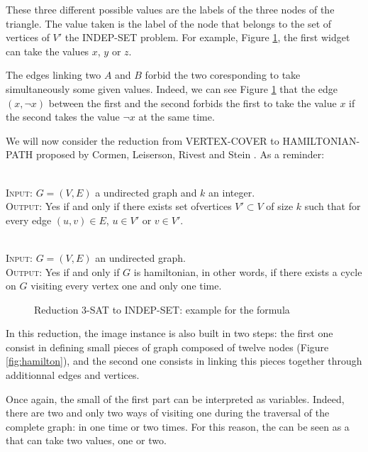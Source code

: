 These three different possible values are the labels of the three
nodes of the triangle. The value taken is the label of the node that
belongs to the set of vertices of $V'$ the INDEP-SET problem. For
example, Figure \ref{fig:3sat}, the first widget can take the
values $x$, $y$ or $z$.

The edges linking two \widgets $A$ and $B$ forbid the two coresponding
\variables to take simultaneously some given values. Indeed, we can
see Figure \ref{fig:3sat} that the edge $(x, \neg x)$ between the
first and the second \widgets forbids the first \widget to take the
value $x$ if the second takes the value $\neg x$ at the same time.

We will now consider the reduction from VERTEX-COVER to
HAMILTONIAN-PATH proposed by Cormen, Leiserson, Rivest and Stein
\cite{cormen}. As a reminder:

\begin{definition}
\ \\
  \textsc{Input:} $G=(V,E)$ a undirected graph and $k$ an integer. \\
  \textsc{Output:} Yes if and only if there exists set ofvertices $V'
  \subset V$ of size $k$ such that for every edge $(u,v) \in E$, $u
  \in V'$ or $v \in V'$.\\
\end{definition}

\begin{definition} 
\ \\
  \textsc{Input:} $G=(V,E)$ an undirected graph.\\
  \textsc{Output:} Yes if and only if $G$ is hamiltonian, in other
  words, if there exists a cycle on $G$ visiting every vertex one and
  only one time.\\
\end{definition}

\begin{figure}
  \centering
  
  \caption{Reduction 3-SAT to INDEP-SET: example for the formula %
}
  \label{fig:3sat}
\end{figure}

In this reduction, the image instance is also built in two steps: the
first one consist in defining small pieces of graph composed of twelve
nodes (Figure \ref{fig:hamilton}), and the second one consists in
linking this pieces together through additionnal edges and
vertices. 

Once again, the small \widgets of the first part can be interpreted as
variables. Indeed, there are two and only two ways of visiting one
\widget during the traversal of the complete graph: in one time or two
times. For this reason, the \widget can be seen as a \variable that
can take two values, one or two.

